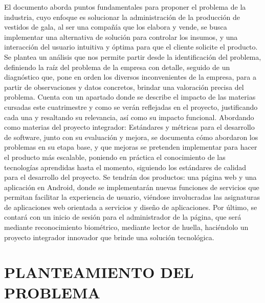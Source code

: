 \documentclass[conference]{IEEEtran}
\begin{document}
El documento aborda puntos fundamentales para proponer el problema de la industria, cuyo enfoque es solucionar la administración de la producción de vestidos de gala, al ser una compañía que los elabora y vende, se busca implementar una alternativa de solución para controlar los insumos, y una interacción del usuario intuitiva y óptima para que el cliente solicite el producto. Se plantea un análisis que nos permite partir desde la identificación del problema, definiendo la raíz del problema de la empresa con detalle, seguido de un diagnóstico que, pone en orden los diversos inconvenientes de la empresa, para a partir de observaciones y datos concretos, brindar una valoración precisa del problema. Cuenta con un apartado donde se describe el impacto de las materias cursadas este cuatrimestre y como se verán reflejadas en el proyecto, justificando cada una y resaltando su relevancia, así como su impacto funcional. Abordando como materias del proyecto integrador: Estándares y métricas para el desarrollo de software, junto con su evaluación y mejora, se documenta cómo abordaron los problemas en su etapa base, y que mejoras se pretenden implementar para hacer el producto más escalable, poniendo en práctica el conocimiento de las tecnologías aprendidas hasta el momento, siguiendo los estándares de calidad para el desarrollo del proyecto. Se tendrán dos productos: una página web y una aplicación en Android, donde se implementarán nuevas funciones de servicios que permitan facilitar la experiencia de usuario, viéndose involucradas las asignaturas de aplicaciones web orientada a servicios y diseño de aplicaciones. Por último, se contará con un inicio de sesión para el administrador de la página, que será mediante reconocimiento biométrico, mediante lector de huella, haciéndolo un proyecto integrador innovador que brinde una solución tecnológica.

\section{PLANTEAMIENTO DEL PROBLEMA}
\end{document}
